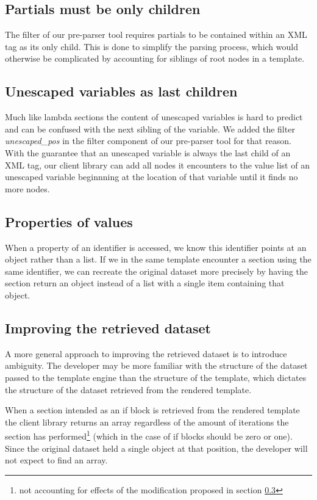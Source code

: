 \documentclass[thesis.tex]{subfiles}
\begin{document}
\subsection{Partials must be only children}
\label{sec:partial-only-child}
The filter of our pre-parser tool requires partials to be contained within an
XML tag as its only child. This is done to simplify the parsing process, which
would otherwise be complicated by accounting for siblings of root nodes in
a template.

\subsection{Unescaped variables as last children}
\label{sec:unescaped-variable-filter}
Much like lambda sections the content of unescaped variables is hard to predict
and can be confused with the next sibling of the variable. We added the filter
\emph{unescaped\_pos} in the filter component of our pre-parser tool for that
reason. With the guarantee that an unescaped variable is always the last child
of an XML tag, our client library can add all nodes it encounters to the value
list of an unescaped variable beginnning at the location of that variable until
it finds no more nodes.

\subsection{Properties of values}
\label{sec:flatten-section}
When a property of an identifier is accessed, we know this identifier points at
an object rather than a list. If we in the same template encounter a section
using the same identifier, we can recreate the original dataset more precisely
by having the section return an object instead of a list with a single item
containing that object.

\subsection{Improving the retrieved dataset}
A more general approach to improving the retrieved dataset is to introduce
ambiguity. The developer may be more familiar with the structure of the dataset
passed to the template engine than the structure of the template, which dictates
the structure of the dataset retrieved from the rendered template.

When a section intended as an if block is retrieved from the rendered template
the client library returns an array regardless of the amount of iterations the
section has performed\footnote{not accounting for effects of the modification
proposed in section \ref{sec:flatten-section}}
(which in the case of if blocks should be zero or one).
Since the original dataset held a single object at that position,
the developer will not expect to find an array.
\end{document}
